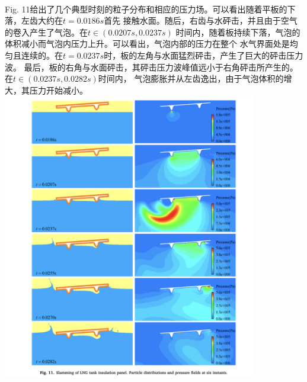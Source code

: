 \documentclass[UTF8]{ctexart}
\begin{document}
\paragraph{\quad}Fig. 11给出了几个典型时刻的粒子分布和相应的压力场。可以看出随着平板的下落，左齿大约在$t=0.0186s$首先
                接触水面。随后，右齿与水砰击，并且由于空气的卷入产生了气泡。在$t \in (0.0207s,0.0237s)$
                时间内，随着板持续下落，气泡的体积减小而气泡内压力上升。可以看出，气泡内部的压力在整个
                水气界面处是均匀且连续的。在$t=0.0237s$时，板的左角与水面猛烈砰击，产生了巨大的砰击压力波。
                最后，板的右角与水面砰击，其砰击压力波峰值远小于右角砰击所产生的。在$t \in (0.0237s,0.0282s)$时间内，
                气泡膨胀并从左齿逸出，由于气泡体积的增大，其压力开始减小。\\
{
    \centering
    \includegraphics[width=30em]{./source/Fig11.png}
}
\end{document}
